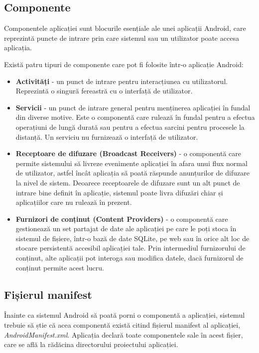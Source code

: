 \documentclass[12pt,a4paper]{report}
\begin{document}
\subsection{Componente}
Componentele aplicației sunt blocurile esențiale ale unei aplicații Android, 
care reprezintă puncte de intrare prin care sistemul sau un utilizator poate accesa aplicația.\cite{android-application-fundamentals}

Există patru tipuri de componente care pot fi folosite într-o aplicație Android:
\begin{itemize}
    \item \textbf{Activități} - un punct de intrare pentru interacțiunea cu utilizatorul. Reprezintă o singură fereastră cu o interfață de utilizator.\cite{android-application-fundamentals}
    \item \textbf{Servicii} - un punct de intrare general pentru menținerea aplicației în fundal din diverse motive. 
    Este o componentă care rulează în fundal pentru a efectua operațiuni de lungă durată sau pentru a efectua sarcini pentru procesele la distanță. 
    Un serviciu nu furnizează o interfață de utilizator.\cite{android-application-fundamentals}
    \item \textbf{Receptoare de difuzare (Broadcast Receivers)} - o componentă care permite sistemului să livreze evenimente aplicației în afara unui flux normal de utilizator, 
    astfel încât aplicația să poată răspunde anunțurilor de difuzare la nivel de sistem. 
    Deoarece receptoarele de difuzare sunt un alt punct de intrare bine definit în aplicație, 
    sistemul poate livra difuzări chiar și aplicațiilor care nu rulează în prezent.\cite{android-application-fundamentals}
    \item \textbf{Furnizori de conținut (Content Providers)} - o componentă care gestionează un set partajat de date ale aplicației pe care le poți stoca în sistemul de fișiere, 
    într-o bază de date SQLite, pe web sau în orice alt loc de stocare persistentă accesibil aplicației tale. 
    Prin intermediul furnizorului de conținut, alte aplicații pot interoga sau modifica datele, dacă furnizorul de conținut permite acest lucru.\cite{android-application-fundamentals}
\end{itemize}

\subsection{Fișierul manifest}
Înainte ca sistemul Android să poată porni o componentă a aplicației, sistemul trebuie să știe că acea componentă există citind fișierul manifest al aplicației, 
\textit{AndroidManifest.xml}. Aplicația declară toate componentele sale în acest fișier, care se află la rădăcina directorului proiectului aplicației.\cite{android-application-fundamentals}
\end{document}
